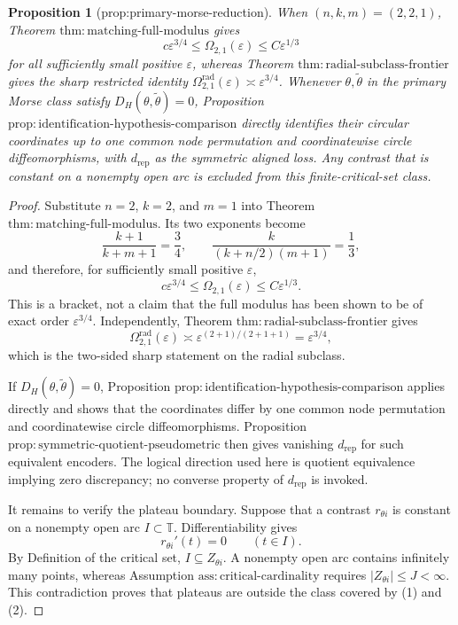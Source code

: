 \documentclass{article}
\newtheorem{proposition}{Proposition}
\begin{document}
\begin{proposition}[prop:primary-morse-reduction]\label{prop:primary-morse-reduction}
When \((n,k,m)=(2,2,1)\), Theorem \(\mathrm{thm:matching\text{-}full\text{-}modulus}\) gives
\[
c\varepsilon^{3/4}
\leq\Omega_{2,1}(\varepsilon)
\leq C\varepsilon^{1/3}
\]
for all sufficiently small positive \(\varepsilon\), whereas Theorem \(\mathrm{thm:radial\text{-}subclass\text{-}frontier}\) gives the sharp restricted identity \(\Omega_{2,1}^{\mathrm{rad}}(\varepsilon)\asymp\varepsilon^{3/4}\). Whenever \(\theta,\widetilde\theta\) in the primary Morse class satisfy \(D_H(\theta,\widetilde\theta)=0\), Proposition \(\mathrm{prop:identification\text{-}hypothesis\text{-}comparison}\) directly identifies their circular coordinates up to one common node permutation and coordinatewise circle diffeomorphisms, with \(d_{\mathrm{rep}}\) as the symmetric aligned loss. Any contrast that is constant on a nonempty open arc is excluded from this finite-critical-set class.
\end{proposition}
\begin{proof}
Substitute \(n=2\), \(k=2\), and \(m=1\) into Theorem \(\mathrm{thm:matching\text{-}full\text{-}modulus}\). Its two exponents become
\[
\frac{k+1}{k+m+1}=\frac34,
\qquad
\frac{k}{(k+n/2)(m+1)}=\frac13,
\]
and therefore, for sufficiently small positive \(\varepsilon\),
\[
c\varepsilon^{3/4}
\leq\Omega_{2,1}(\varepsilon)
\leq C\varepsilon^{1/3}.
\tag{1}
\]
This is a bracket, not a claim that the full modulus has been shown to be of exact order \(\varepsilon^{3/4}\). Independently, Theorem \(\mathrm{thm:radial\text{-}subclass\text{-}frontier}\) gives
\[
\Omega_{2,1}^{\mathrm{rad}}(\varepsilon)
\asymp
\varepsilon^{(2+1)/(2+1+1)}
=\varepsilon^{3/4},
\tag{2}
\]
which is the two-sided sharp statement on the radial subclass.

If \(D_H(\theta,\widetilde\theta)=0\), Proposition \(\mathrm{prop:identification\text{-}hypothesis\text{-}comparison}\) applies directly and shows that the coordinates differ by one common node permutation and coordinatewise circle diffeomorphisms. Proposition \(\mathrm{prop:symmetric\text{-}quotient\text{-}pseudometric}\) then gives vanishing \(d_{\mathrm{rep}}\) for such equivalent encoders. The logical direction used here is quotient equivalence implying zero discrepancy; no converse property of \(d_{\mathrm{rep}}\) is invoked.

It remains to verify the plateau boundary. Suppose that a contrast \(r_{\theta i}\) is constant on a nonempty open arc \(I\subset\mathbb T\). Differentiability gives
\[
r_{\theta i}'(t)=0
\qquad (t\in I).
\]
By Definition of the critical set, \(I\subseteq Z_{\theta i}\). A nonempty open arc contains infinitely many points, whereas Assumption \(\mathrm{ass:critical\text{-}cardinality}\) requires \(|Z_{\theta i}|\leq J<\infty\). This contradiction proves that plateaus are outside the class covered by (1) and (2).
\end{proof}
\end{document}
